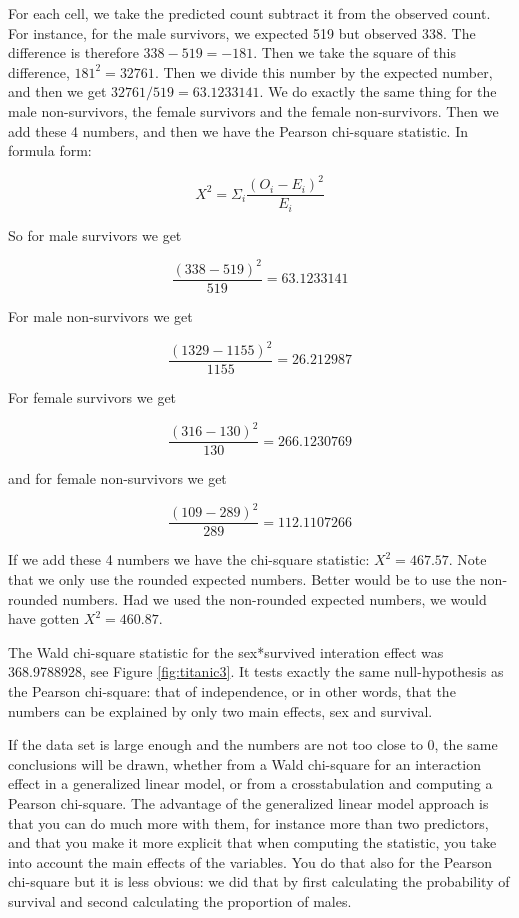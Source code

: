 \documentclass[]{report}\usepackage[]{graphicx}\usepackage[]{color}
\begin{document}
For each cell, we take the predicted count subtract it from the observed count. For instance, for the male survivors, we expected 519 but observed 338. The difference is therefore $338-519= -181$. Then we take the square of this difference, $ 181^2=32761$. Then we divide this number by the expected number, and then we get $32761/519=63.1233141$. We do exactly the same thing for the male non-survivors, the female survivors and the female non-survivors. Then we add these 4 numbers, and then we have the Pearson chi-square statistic. In formula form:

\begin{equation}
X^2 = \Sigma_i    \frac{(O_i-E_i)^2}{E_i}
\end{equation}


So for male survivors we get


\begin{equation}
 \frac{(338-519)^2}{519} =63.1233141
\end{equation}




For male non-survivors we get


\begin{equation}
 \frac{(1329-1155)^2}{1155} =26.212987
\end{equation}

For female survivors we get


\begin{equation}
 \frac{(316-130)^2}{130} =266.1230769
\end{equation}

and for female non-survivors we get

\begin{equation}
 \frac{(109-289)^2}{289} =112.1107266
\end{equation}




If we add these 4 numbers we have the chi-square statistic: $X^2= 467.57$. Note that we only use the rounded expected numbers. Better would be to use the non-rounded numbers. Had we used the non-rounded expected numbers, we would have gotten $X^2 = 460.87$.

The Wald chi-square statistic for the sex*survived interation effect was 368.9788928, see Figure \ref{fig:titanic3}. It tests exactly the same null-hypothesis as the Pearson chi-square: that of independence, or in other words, that the numbers can be explained by only two main effects, sex and survival.

If the data set is large enough and the numbers are not too close to 0, the same conclusions will be drawn, whether from a Wald chi-square for an interaction effect in a generalized linear model, or from a crosstabulation and computing a Pearson chi-square. The advantage of the generalized linear model approach is that you can do much more with them, for instance more than two predictors, and that you make it more explicit that when computing the statistic, you take into account the main effects of the variables. You do that also for the Pearson chi-square but it is less obvious: we did that by first calculating the probability of survival and second calculating the proportion of males.
\end{document}
